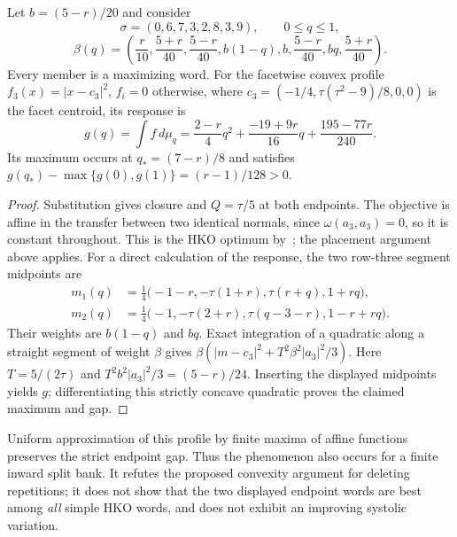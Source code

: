 \begin{proposition}\label{prop:mc-interior}
Let $b=(5-r)/20$ and consider
\[
 \sigma=(0,6,7,3,2,8,3,9),\qquad 0\leq q\leq1,
\]\[
 \beta(q)=\left(\frac r{10},\frac{5+r}{40},\frac{5-r}{40},
 b(1-q),b,\frac{5-r}{40},bq,\frac{5+r}{40}\right).
\]
Every member is a maximizing word. For the facetwise convex profile
$f_3(x)=|x-c_3|^2$, $f_i=0$ otherwise, where
$c_3=(-1/4,\tau(\tau^2-9)/8,0,0)$ is the facet centroid, its response is
\[
 g(q)=\int f\,d\mu_q
 =\frac{2-r}{4}q^2+\frac{-19+9r}{16}q+\frac{195-77r}{240}.
\]
Its maximum occurs at $q_*=(7-r)/8$ and satisfies
$g(q_*)-\max\{g(0),g(1)\}=(r-1)/128>0$.
\end{proposition}
\begin{proof}
Substitution gives closure and $Q=\tau/5$ at both endpoints. The objective
is affine in the transfer between two identical normals, since
$\omega(a_3,a_3)=0$, so it is constant throughout. This is the HKO optimum
by~\cite{HKO2026}; the placement argument above applies.
For a direct calculation of the response, the two row-three segment
midpoints are
\[
 \begin{aligned}
 m_1(q)&=\frac14\bigl(-1-r,-\tau(1+r),\tau(r+q),1+rq\bigr),\\
 m_2(q)&=\frac14\bigl(-1,-\tau(2+r),\tau(q-3-r),1-r+rq\bigr).
 \end{aligned}
\]
Their weights are $b(1-q)$ and $bq$. Exact integration of a quadratic along
a straight segment of weight $\beta$ gives
$\beta(|m-c_3|^2+T^2\beta^2|a_3|^2/3)$.
Here $T=5/(2\tau)$ and $T^2b^2|a_3|^2/3=(5-r)/24$.
Inserting the displayed midpoints yields $g$; differentiating this
strictly concave quadratic proves the claimed maximum and gap.
\end{proof}

Uniform approximation of this profile by finite maxima of affine functions
preserves the strict endpoint gap. Thus the phenomenon also occurs for a
finite inward split bank. It refutes the proposed convexity argument for
deleting repetitions; it does not show that the two displayed endpoint words
are best among \emph{all} simple HKO words, and does not exhibit an improving
systolic variation.
